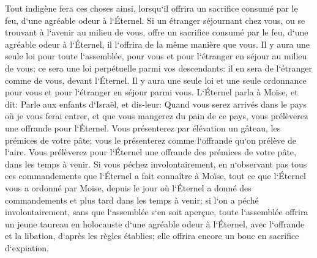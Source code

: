 \verse Tout indigène fera ces choses ainsi, lorsqu`il offrira un sacrifice consumé par le feu, d`une agréable odeur à l`Éternel. 
\verse Si un étranger séjournant chez vous, ou se trouvant à l`avenir au milieu de vous, offre un sacrifice consumé par le feu, d`une agréable odeur à l`Éternel, il l`offrira de la même manière que vous. 
\verse Il y aura une seule loi pour toute l`assemblée, pour vous et pour l`étranger en séjour au milieu de vous; ce sera une loi perpétuelle parmi vos descendants: il en sera de l`étranger comme de vous, devant l`Éternel. 
\verse Il y aura une seule loi et une seule ordonnance pour vous et pour l`étranger en séjour parmi vous. 
\verse L`Éternel parla à Moïse, et dit: 
\verse Parle aux enfants d`Israël, et dis-leur: Quand vous serez arrivés dans le pays où je vous ferai entrer, 
\verse et que vous mangerez du pain de ce pays, vous prélèverez une offrande pour l`Éternel. 
\verse Vous présenterez par élévation un gâteau, les prémices de votre pâte; vous le présenterez comme l`offrande qu`on prélève de l`aire. 
\verse Vous prélèverez pour l`Éternel une offrande des prémices de votre pâte, dans les temps à venir. 
\verse Si vous péchez involontairement, en n`observant pas tous ces commandements que l`Éternel a fait connaître à Moïse, 
\verse tout ce que l`Éternel vous a ordonné par Moïse, depuis le jour où l`Éternel a donné des commandements et plus tard dans les temps à venir; 
\verse si l`on a péché involontairement, sans que l`assemblée s`en soit aperçue, toute l`assemblée offrira un jeune taureau en holocauste d`une agréable odeur à l`Éternel, avec l`offrande et la libation, d`après les règles établies; elle offrira encore un bouc en sacrifice d`expiation. 
